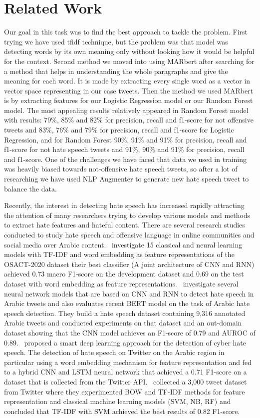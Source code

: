 \documentclass[10pt, a4paper, twoside, twocolumn]{article}
\begin{document}
\section{Related Work}\label{sec:related_work}
Our goal in this task was to find the best approach to tackle the problem. First trying we have used tfidf technique, but the problem was that model was detecting words by its own meaning only without looking how it would be helpful for the context. Second method we moved into using MARbert after searching for a method that helps in understanding the whole paragraphs and give the meaning for each word. It is made by extracting every single word as a vector in vector space representing in our case tweets. Then the method we used MARbert is by extracting features for our Logistic Regression model or our Random Forest model. The most appealing results relatively appeared in Random Forest model with results: 79\%, 85\% and 82\% for precision, recall and f1-score for not offensive tweets and 83\%, 76\% and 79\% for precision, recall and f1-score for Logistic Regression, and for Random Forest 90\%, 91\% and 91\% for precision, recall and f1-score for not hate speech tweets and 91\%, 90\% and 91\% for precision, recall and f1-score. One of the challenges we have faced that data we used in training was heavily biased towards not-offensive hate speech tweets, so after a lot of researching we have used NLP Augmenter to generate new hate speech tweet to balance the data.

Recently, the interest in detecting hate speech has increased rapidly attracting the attention of many researchers trying to develop various models and methods to extract hate features and hateful content. There are several research studies conducted to study hate speech and offensive language in online communities and social media over Arabic content.~\cite{abuzayed2020quick} investigate 15 classical and neural learning models with TF-IDF and word embedding as feature representations of the OSACT-2020 dataset their best classifier (A joint architecture of CNN and RNN) achieved 0.73 macro F1-score on the development dataset and 0.69 on the test dataset with word embedding as feature representations.~\cite{alshaalan2020hate} investigate several neural network models that are based on CNN and RNN to detect hate speech in Arabic tweets and also evaluates recent BERT model on the task of Arabic hate speech detection. They build a hate speech dataset containing 9,316 annotated Arabic tweets and conducted experiments on that dataset and an out-domain dataset showing that the CNN model achieves an F1-score of 0.79 and AUROC of 0.89.~\cite{faris2020hate} proposed a smart deep learning approach for the detection of cyber hate speech. The detection of hate speech on Twitter on the Arabic region in particular using a word embedding mechanism for feature representation and fed to a hybrid CNN and LSTM neural network that achieved a 0.71 F1-score on a dataset that is collected from the Twitter API.~\cite{al2020hate} collected a 3,000 tweet dataset from Twitter where they experimented BOW and TF-IDF methods for feature representation and classical machine learning models (SVM, NB, RF) and concluded that TF-IDF with SVM achieved the best results of 0.82 F1-score.
\end{document}
